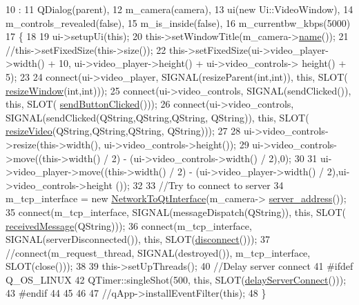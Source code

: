 \begin{DoxyCode}
10                                                         :
11     QDialog(parent),
12     m\_camera(camera),
13     ui(\textcolor{keyword}{new} Ui::VideoWindow),
14     m\_controls\_revealed(\textcolor{keyword}{false}),
15     m\_is\_inside(\textcolor{keyword}{false}),
16     m\_currentbw\_kbps(5000)
17 \{   
18 
19     ui->setupUi(\textcolor{keyword}{this});
20     this->setWindowTitle(m\_camera->\hyperlink{classCamera_a5763757e8d6adb6437dde2502072a3b1}{name}());
21     \textcolor{comment}{//this->setFixedSize(this->size());}
22     this->setFixedSize(ui->video\_player->width() + 10, ui->video\_player->height() + ui->video\_controls->
      height() + 5);
23 
24     connect(ui->video\_player, SIGNAL(resizeParent(\textcolor{keywordtype}{int},\textcolor{keywordtype}{int})), \textcolor{keyword}{this}, SLOT(
      \hyperlink{classVideoWindow_a5035f10be178cfc311d637c19938a344}{resizeWindow}(\textcolor{keywordtype}{int},\textcolor{keywordtype}{int})));
25     connect(ui->video\_controls, SIGNAL(sendClicked()), \textcolor{keyword}{this}, SLOT(
      \hyperlink{classVideoWindow_a655194e6449c76e200135c88f8fafd7d}{sendButtonClicked}()));
26     connect(ui->video\_controls, SIGNAL(sendClicked(QString,QString,QString, QString)), \textcolor{keyword}{this}, SLOT(
      \hyperlink{classVideoWindow_ac07f4db8a805849174cb129134708fd4}{resizeVideo}(QString,QString,QString, QString)));
27 
28     ui->video\_controls->resize(this->width(), ui->video\_controls->height());
29     ui->video\_controls->move((this->width() / 2) - (ui->video\_controls->width() / 2),0);
30 
31     ui->video\_player->move((this->width() / 2) - (ui->video\_player->width() / 2),ui->video\_controls->height
      ());
32 
33     \textcolor{comment}{//Try to connect to server}
34     m\_tcp\_interface = \textcolor{keyword}{new} \hyperlink{classNetworkToQtInterface}{NetworkToQtInterface}(m\_camera->
      \hyperlink{classCamera_aa93654bec9b65adfb95e192ac9c71e80}{server\_address}());
35     connect(m\_tcp\_interface, SIGNAL(messageDispatch(QString)), \textcolor{keyword}{this}, SLOT(
      \hyperlink{classVideoWindow_ab25ad37e9dfdb92f46212d4309d4232f}{receivedMessage}(QString)));
36     connect(m\_tcp\_interface, SIGNAL(serverDisconnected()), \textcolor{keyword}{this}, SLOT(\hyperlink{classVideoWindow_a68b4f26c999360c30b12cc70347393c7}{disconnect}()));
37     \textcolor{comment}{//connect(m\_request\_thread, SIGNAL(destroyed()), m\_tcp\_interface, SLOT(close()));}
38 
39     this->setUpThreads();
40     \textcolor{comment}{//Delay server connect}
41 \textcolor{preprocessor}{#ifdef Q\_OS\_LINUX}
42 \textcolor{preprocessor}{}    QTimer::singleShot(500, \textcolor{keyword}{this}, SLOT(\hyperlink{classVideoWindow_a55220de4b6b3b8e2575201c933932059}{delayServerConnect}()));
43 \textcolor{preprocessor}{#endif}
44 \textcolor{preprocessor}{}
45 
46 
47     \textcolor{comment}{//qApp->installEventFilter(this);}
48 \}
\end{DoxyCode}
